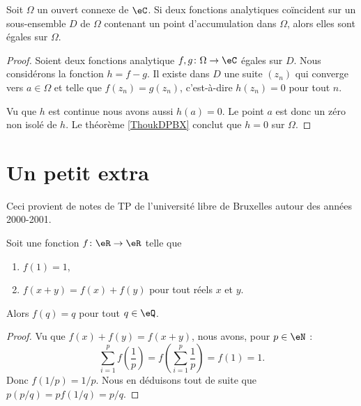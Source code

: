 \begin{theorem}\label{ThoAVBCewB}
	Soit \( \Omega\) un ouvert connexe de \( \eC\). Si deux fonctions analytiques coïncident sur un sous-ensemble \( D\) de \( \Omega\) contenant un point d'accumulation dans \( \Omega\), alors elles sont égales sur \( \Omega\).
\end{theorem}

\begin{proof}
	Soient deux fonctions analytique \( f,g\colon \Omega\to \eC\) égales sur \( D\). Nous considérons la fonction \( h=f-g\). Il existe dans \( D\) une suite \( (z_n)\) qui converge vers \( a\in \Omega\) et telle que \( f(z_n)=g(z_n)\), c'est-à-dire \( h(z_n)=0\) pour tout \( n\).

	Vu que \( h\) est continue nous avons aussi \( h(a)=0\). Le point \( a\) est donc un zéro non isolé de \( h\). Le théorème \ref{ThoukDPBX} conclut que \( h=0\) sur \( \Omega\).
\end{proof}

\section{Un petit extra}

Ceci provient de notes de TP de l'université libre de Bruxelles autour des années 2000-2001\cite{BIBooFYVSooNIiApF}.

\begin{lemma}        \label{LEMooXRMAooRADhOM}
	Soit une fonction \( f\colon \eR\to \eR\) telle que
	\begin{enumerate}

		\item		\label{ItemExtrai}
		      \( f(1)=1\),

		\item		\label{ItemExtraii}
		      \( f(x+y)=f(x)+f(y)\) pour tout réels \( x\) et \( y\).
	\end{enumerate}
	Alors \( f(q)=q\) pour tout \( q\in \eQ\).
\end{lemma}

\begin{proof}
	Vu que \( f(x)+f(y)=f(x+y)\), nous avons, pour \( p\in \eN\) :
	\begin{equation}
		\sum_{i=1}^pf(\frac{1}{ p })=f(\sum_{i=1}^p\frac{1}{ p })=f(1)=1.
	\end{equation}
	Donc \( f(1/p)=1/p\). Nous en déduisons tout de suite que \( p(p/q)=pf(1/q)=p/q\).
\end{proof}


